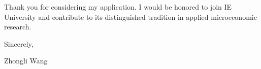 \documentclass{nfr}
\begin{document}
Thank you for considering my application. 
I would be honored to join IE University and contribute to its distinguished tradition in applied microeconomic research.\\
\vspace{10mm}

\noindent Sincerely,\\
\vspace{19mm}

\noindent Zhongli Wang

\vspace{10mm}




\end{document}
